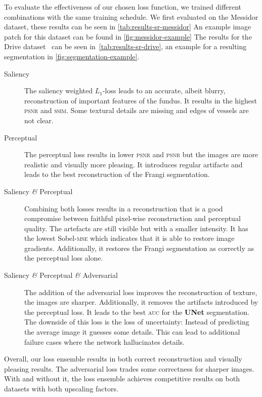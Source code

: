 \documentclass{scrartcl}
\begin{document}
To evaluate the effectiveness of our chosen loss function, we trained different combinations with the same training schedule.
We first evaluated on the Messidor dataset, these results can be seen in \cref{tab:results-sr-messidor}
An example image patch for this dataset can be found in \cref{fig:messidor-example}
The results for the Drive dataset~\cite{Drive} can be seen in~\cref{tab:results-sr-drive}, an example for a resulting segmentation in \cref{fig:segmentation-example}.
\begin{description}
\item[Saliency] The saliency weighted $L_1$-loss leads to an accurate, albeit blurry, reconstruction of important features of the fundus.
  It results in the highest \textsc{psnr} and \textsc{ssim}.
  Some textural details are missing and edges of vessels are not clear.
\item[Perceptual] The perceptual loss results in lower \textsc{psnr} and \textsc{psnr} but the images are more realistic and visually more pleasing.
  It introduces regular artifacts and leads to the best reconstruction of the Frangi segmentation.
\item[Saliency \textit{\&} Perceptual] Combining both losses results in a reconstruction that is a good compromise between faithful pixel-wise reconstruction and perceptual quality.
  The artefacts are still visible but with a smaller intensity.
  It has the lowest Sobel-\textsc{mse} which indicates that it is able to restore image gradients.
  Additionally, it restores the Frangi segmentation as correctly as the perceptual loss alone.
\item[Saliency \textit{\&} Perceptual \textit{\&} Adversarial]
  The addition of the adversarial loss improves the reconstruction of texture, the images are sharper.
  Additionally, it removes the artifacts introduced by the perceptual loss.
  It leads to the best \textsc{auc} for the \textbf{UNet} segmentation.
  The downside of this loss is the loss of uncertainty:
  Instead of predicting the average image it guesses some details.
  This can lead to additional failure cases where the network hallucinates details.
\end{description}
Overall, our loss ensemble results in both correct reconstruction and visually pleasing results.
The adversarial loss trades some correctness for sharper images.
With and without it, the loss ensemble achieves competitive results on both datasets with both upscaling factors.
\end{document}
